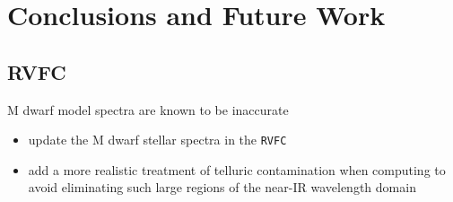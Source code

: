 \chapter{Conclusions and Future Work}

\section{RVFC}
M dwarf model spectra are known to be inaccurate \citep{passegger16}

\begin{itemize}
\item update the M dwarf stellar spectra in the \texttt{RVFC}
\item add a more realistic treatment of telluric contamination when computing
  \sigRV{} to avoid eliminating such large regions of the near-IR wavelength
  domain
\end{itemize}
